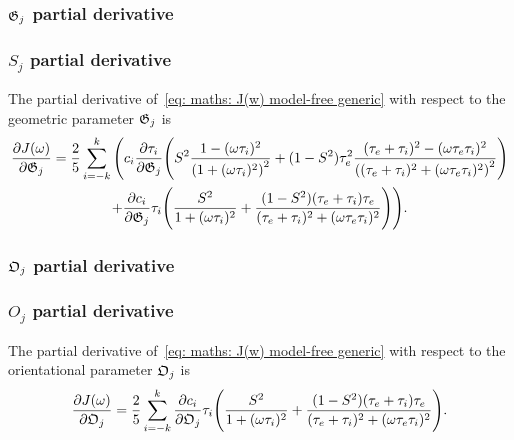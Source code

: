 \begin{latexonly}
    \subsubsection{$\mathfrak{G}_j$ partial derivative}
\end{latexonly}
\begin{htmlonly}
    \subsubsection{$S_j$ partial derivative}
\end{htmlonly}

The partial derivative of~\eqref{eq: maths: J(w) model-free generic} with respect to the geometric parameter $\mathfrak{G}_j$ is
\begin{multline}
    \frac{\partial J(\omega)}{\partial \mathfrak{G}_j} = \frac{2}{5} \sum_{i=-k}^k \Bigg(
        c_i \frac{\partial \tau_i}{\partial \mathfrak{G}_j} \Bigg(
            S^2 \frac{1 - (\omega \tau_i)^2}{\left(1 + (\omega \tau_i)^2 \right)^2}
            + (1 - S^2) \tau_e^2 \frac{(\tau_e + \tau_i)^2 - (\omega \tau_e \tau_i)^2}{\left((\tau_e + \tau_i)^2 + (\omega \tau_e \tau_i)^2 \right)^2}
        \Bigg) \\
        +  \frac{\partial c_i}{\partial \mathfrak{G}_j} \tau_i \Bigg(
            \frac{S^2}{1 + (\omega \tau_i)^2}
            + \frac{(1 - S^2)(\tau_e + \tau_i)\tau_e}{(\tau_e + \tau_i)^2 + (\omega \tau_e \tau_i)^2}
        \Bigg)
    \Bigg).
\end{multline}



\begin{latexonly}
    \subsubsection{$\mathfrak{O}_j$ partial derivative}
\end{latexonly}
\begin{htmlonly}
    \subsubsection{$O_j$ partial derivative}
\end{htmlonly}

The partial derivative of~\eqref{eq: maths: J(w) model-free generic} with respect to the orientational parameter $\mathfrak{O}_j$ is
\begin{equation}
    \frac{\partial J(\omega)}{\partial \mathfrak{O}_j} = \frac{2}{5} \sum_{i=-k}^k \frac{\partial c_i}{\partial \mathfrak{O}_j} \tau_i \Bigg(
        \frac{S^2}{1 + (\omega \tau_i)^2}
        + \frac{(1 - S^2)(\tau_e + \tau_i)\tau_e}{(\tau_e + \tau_i)^2 + (\omega \tau_e \tau_i)^2}
    \Bigg).
\end{equation}



